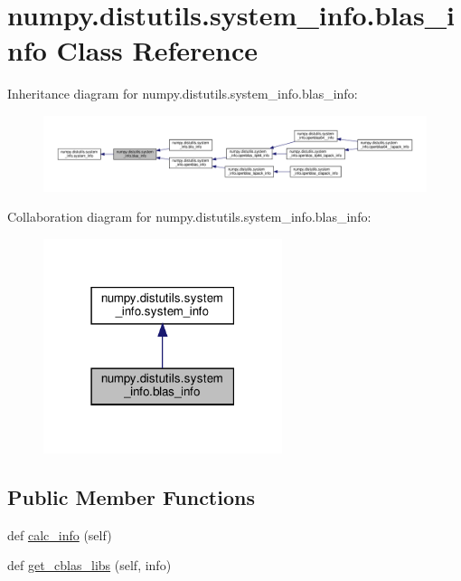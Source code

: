 \hypertarget{classnumpy_1_1distutils_1_1system__info_1_1blas__info}{}\section{numpy.\+distutils.\+system\+\_\+info.\+blas\+\_\+info Class Reference}
\label{classnumpy_1_1distutils_1_1system__info_1_1blas__info}


Inheritance diagram for numpy.\+distutils.\+system\+\_\+info.\+blas\+\_\+info\+:
\nopagebreak
\begin{figure}[H]
\begin{center}
\leavevmode
\includegraphics[width=350pt]{classnumpy_1_1distutils_1_1system__info_1_1blas__info__inherit__graph}
\end{center}
\end{figure}


Collaboration diagram for numpy.\+distutils.\+system\+\_\+info.\+blas\+\_\+info\+:
\nopagebreak
\begin{figure}[H]
\begin{center}
\leavevmode
\includegraphics[width=198pt]{classnumpy_1_1distutils_1_1system__info_1_1blas__info__coll__graph}
\end{center}
\end{figure}
\subsection*{Public Member Functions}
\begin{DoxyCompactItemize}
\item 
def \hyperlink{classnumpy_1_1distutils_1_1system__info_1_1blas__info_accafdaaed8300b2e39300f8296218f69}{calc\+\_\+info} (self)
\item 
def \hyperlink{classnumpy_1_1distutils_1_1system__info_1_1blas__info_a536a7fd300d4c5f24f45fdfe9a9877b0}{get\+\_\+cblas\+\_\+libs} (self, info)
\end{DoxyCompactItemize}
